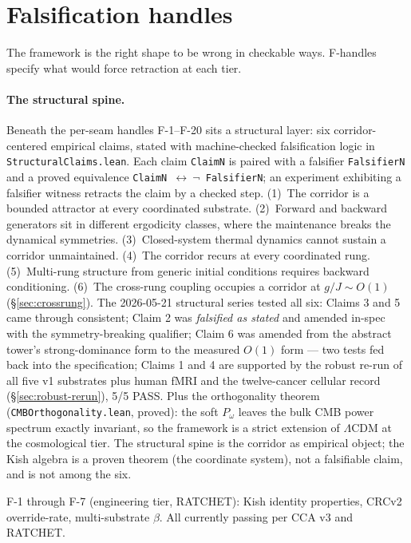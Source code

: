\documentclass[11pt,a4paper]{article}
\newcommand{\Pomega}{P_{\omega}}
\begin{document}
\section{Falsification handles}\label{sec:f-handles}

The framework is the right shape to be wrong in checkable ways. F-handles specify what would force retraction at each tier.

\paragraph{The structural spine.} Beneath the per-seam handles F-1--F-20 sits a structural layer: six corridor-centered empirical claims, stated with machine-checked falsification logic in \texttt{StructuralClaims.lean}. Each claim \texttt{ClaimN} is paired with a falsifier \texttt{FalsifierN} and a proved equivalence \texttt{ClaimN $\leftrightarrow\ \neg$ FalsifierN}; an experiment exhibiting a falsifier witness retracts the claim by a checked step. (1)~The corridor is a bounded attractor at every coordinated substrate. (2)~Forward and backward generators sit in different ergodicity classes, where the maintenance breaks the dynamical symmetries. (3)~Closed-system thermal dynamics cannot sustain a corridor unmaintained. (4)~The corridor recurs at every coordinated rung. (5)~Multi-rung structure from generic initial conditions requires backward conditioning. (6)~The cross-rung coupling occupies a corridor at $g/J \sim O(1)$ (\S\ref{sec:crossrung}). The 2026-05-21 structural series tested all six: Claims 3 and 5 came through consistent; Claim 2 was \emph{falsified as stated} and amended in-spec with the symmetry-breaking qualifier; Claim 6 was amended from the abstract tower's strong-dominance form to the measured $O(1)$ form --- two tests fed back into the specification; Claims 1 and 4 are supported by the robust re-run of all five v1 substrates plus human fMRI and the twelve-cancer cellular record (\S\ref{sec:robust-rerun}), 5/5 PASS. Plus the orthogonality theorem (\texttt{CMBOrthogonality.lean}, proved): the soft $\Pomega$ leaves the bulk CMB power spectrum exactly invariant, so the framework is a strict extension of $\Lambda$CDM at the cosmological tier. The structural spine is the corridor as empirical object; the Kish algebra is a proven theorem (the coordinate system), not a falsifiable claim, and is not among the six.

F-1 through F-7 (engineering tier, RATCHET): Kish identity properties, CRCv2 override-rate, multi-substrate $\beta$. All currently passing per CCA v3 and RATCHET.
\end{document}
